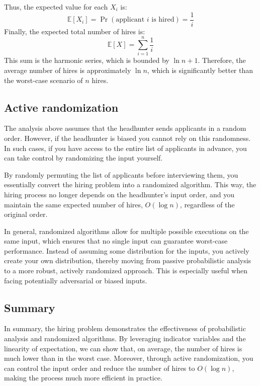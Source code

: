 Thus, the expected value for each $X_i$ is:
\[\mathbb{E}[X_i]=\Pr(\text{applicant }i\text{ is hired})=\dfrac{1}{i}\]
Finally, the expected total number of hires is:
\[\mathbb{E}[X]=\sum_{i=1}^n\dfrac{1}{i}\]
This sum is the harmonic series, which is bounded by $\ln n + 1$. 
Therefore, the average number of hires is approximately $\ln n$, which is significantly better than the worst-case scenario of $n$ hires.

\subsection{Active randomization}
The analysis above assumes that the headhunter sends applicants in a random order. 
However, if the headhunter is biased you cannot rely on this randomness. 
In such cases, if you have access to the entire list of applicants in advance, you can take control by randomizing the input yourself.

By randomly permuting the list of applicants before interviewing them, you essentially convert the hiring problem into a randomized algorithm. 
This way, the hiring process no longer depends on the headhunter's input order, and you maintain the same expected number of hires, $O(\log n)$, regardless of the original order.

In general, randomized algorithms allow for multiple possible executions on the same input, which ensures that no single input can guarantee worst-case performance. 
Instead of assuming some distribution for the inputs, you actively create your own distribution, thereby moving from passive probabilistic analysis to a more robust, actively randomized approach. 
This is especially useful when facing potentially adversarial or biased inputs.

\subsection{Summary}
In summary, the hiring problem demonstrates the effectiveness of probabilistic analysis and randomized algorithms. 
By leveraging indicator variables and the linearity of expectation, we can show that, on average, the number of hires is much lower than in the worst case. 
Moreover, through active randomization, you can control the input order and reduce the number of hires to $O(\log n)$, making the process much more efficient in practice.